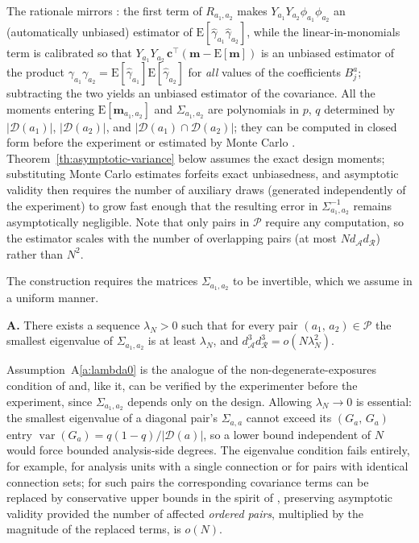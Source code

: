 \documentclass[sigconf,nonacm]{acmart}
\newcounter{assumption}
\newenvironment{assumption}{\refstepcounter{assumption}\par\medskip\noindent\textbf{A\theassumption.}\enspace}{\par\medskip}
\newcommand{\E}{\mathrm E}
\DeclareMathOperator{\var}{var}
\begin{document}
The rationale mirrors \cite[Section~5.1]{harshaw2023erl}: the first term of $R_{a_1,a_2}$ makes $Y_{a_1}Y_{a_2}\phi_{a_1}\phi_{a_2}$ an (automatically unbiased) estimator of $\E[\hat\gamma_{a_1}\hat\gamma_{a_2}]$, while the linear-in-monomials term is calibrated so that $Y_{a_1}Y_{a_2}\,\mathbf c^{\top}(\mathbf m-\E[\mathbf m])$ is an unbiased estimator of the product $\gamma_{a_1}\gamma_{a_2}=\E[\hat\gamma_{a_1}]\E[\hat\gamma_{a_2}]$ for \emph{all} values of the coefficients $B^a_j$; subtracting the two yields an unbiased estimator of the covariance. All the moments entering $\E[\mathbf m_{a_1,a_2}]$ and $\Sigma_{a_1,a_2}$ are polynomials in $p$, $q$ determined by $|\mathcal D(a_1)|$, $|\mathcal D(a_2)|$, and $|\mathcal D(a_1)\cap\mathcal D(a_2)|$; they can be computed in closed form before the experiment or estimated by Monte Carlo \cite{fattorini2006applying}. Theorem~\ref{th:asymptotic-variance} below assumes the exact design moments; substituting Monte Carlo estimates forfeits exact unbiasedness, and asymptotic validity then requires the number of auxiliary draws (generated independently of the experiment) to grow fast enough that the resulting error in $\Sigma^{-1}_{a_1,a_2}$ remains asymptotically negligible. Note that only pairs in $\mathcal P$ require any computation, so the estimator scales with the number of overlapping pairs (at most $Nd_{\mathcal A}d_{\mathcal R}$) rather than $N^2$.

The construction requires the matrices $\Sigma_{a_1,a_2}$ to be invertible, which we assume in a uniform manner.

\begin{assumption}\label{a:lambda0}
    There exists a sequence $\lambda_N>0$ such that for every pair $(a_1,\,a_2)\in\mathcal P$ the smallest eigenvalue of $\Sigma_{a_1,a_2}$ is at least $\lambda_N$, and $d^{3}_{\mathcal A}d^{3}_{\mathcal R} = o(N\lambda_N^2)$.
\end{assumption}

Assumption~A\ref{a:lambda0} is the analogue of the non-degenerate-exposures condition of \cite[Assumption~4]{harshaw2023erl} and, like it, can be verified by the experimenter before the experiment, since $\Sigma_{a_1,a_2}$ depends only on the design. Allowing $\lambda_N\to0$ is essential: the smallest eigenvalue of a diagonal pair's $\Sigma_{a,a}$ cannot exceed its $(G_a,\,G_a)$ entry $\var(G_a) = q(1-q)/|\mathcal D(a)|$, so a lower bound independent of $N$ would force bounded analysis-side degrees. The eigenvalue condition fails entirely, for example, for analysis units with a single connection or for pairs with identical connection sets; for such pairs the corresponding covariance terms can be replaced by conservative upper bounds in the spirit of \cite[Proposition~5.2]{harshaw2023erl}, preserving asymptotic validity provided the number of affected \emph{ordered pairs}, multiplied by the magnitude of the replaced terms, is $o(N)$.
\end{document}
